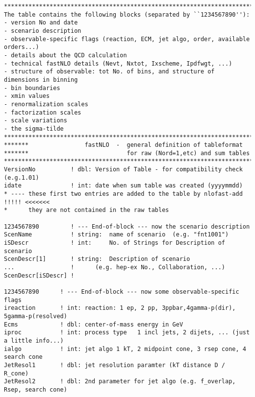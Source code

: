 {\small \footnotesize
\begin{verbatim} 
******************************************************************************
The table contains the following blocks (separated by ``1234567890''):
- version No and date
- scenario description
- observable-specific flags (reaction, ECM, jet algo, order, available orders...)
- details about the QCD calculation
- technical fastNLO details (Nevt, Nxtot, Ixscheme, Ipdfwgt, ...)
- structure of observable: tot No. of bins, and structure of dimensions in binning
- bin boundaries 
- xmin values
- renormalization scales
- factorization scales
- scale variations
- the sigma-tilde
******************************************************************************
*******                fastNLO  -  general definition of tableformat
*******                            for raw (Nord=1,etc) and sum tables
******************************************************************************
VersionNo          ! dbl: Version of Table - for compatibility check (e.g.1.01)
idate              ! int: date when sum table was created (yyyymmdd)
* ---- these first two entries are added to the table by nlofast-add !!!!! <<<<<<<
*      they are not contained in the raw tables

1234567890         ! --- End-of-block --- now the scenario description
ScenName           ! string:  name of scenario  (e.g. "fnt1001")
iSDescr            ! int:     No. of Strings for Description of scenario
ScenDescr[1]       ! string:  Description of scenario
...                !      (e.g. hep-ex No., Collaboration, ...)
ScenDescr[iSDescr] ! 

1234567890      ! --- End-of-block --- now some observable-specific flags
ireaction       ! int: reaction: 1 ep, 2 pp, 3ppbar,4gamma-p(dir), 5gamma-p(resolved)
Ecms            ! dbl: center-of-mass energy in GeV
iproc           ! int: process type   1 incl jets, 2 dijets, ... (just a little info...)
ialgo           ! int: jet algo 1 kT, 2 midpoint cone, 3 rsep cone, 4 search cone 
JetResol1       ! dbl: jet resolution paramter (kT distance D / R_cone)
JetResol2       ! dbl: 2nd parameter for jet algo (e.g. f_overlap, Rsep, search cone)


\end{verbatim}}

